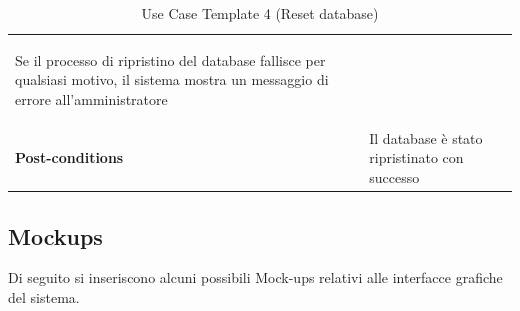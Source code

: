 \documentclass{article}
\begin{document}
\begin{table}
\begin{tabularx}{\textwidth}{|lX|}
\begin{description}[nosep,before=\leavevmode\vspace*{-1\baselineskip},after=\leavevmode\vspace*{-1\baselineskip}]
                                                                        \item [3a.] Se il processo di ripristino del database fallisce per qualsiasi motivo, il sistema mostra un messaggio di errore all'amministratore
                                                                    \end{description} \\
                    \rowcolor{white} \textbf{Post-conditions} & Il database è stato ripristinato con successo \\
                    \toprule
                \end{tabularx}
                
                \caption{Use Case Template 4 (Reset database)}
                \label{tab:use-case-template-4}
            \end{table}
            \clearpage

            
\subsection{Mockups}\label{subsec:mockups}
Di seguito si inseriscono alcuni possibili Mock-ups relativi alle interfacce grafiche del sistema.
\end{document}
